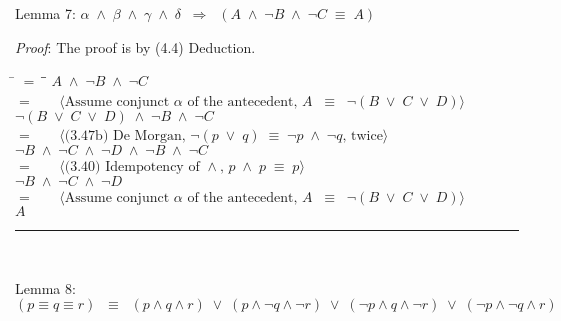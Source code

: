 \documentclass[12pt, fleqn, leqno]{article}
\newcommand{\lgap}{2pt}                             %
\newcommand{\mymathindent}{24pt}                    %
\newcommand{\equivs}{\ensuremath{\;\equiv\;}}       %
\newcommand{\equivss}{\ensuremath{\;\;\equiv\;\;}}  %
\newcommand{\lors}{\ensuremath{\;\lor\;}}           %
\newcommand{\lands}{\ensuremath{\;\land\;}}      %
\newcommand{\impl}{\ensuremath{\Rightarrow}}        %
\newcommand{\myqed}{\rule[-.23ex]{1.2ex}{2.0ex}}
\newcommand{\myqedtab}{\hspace{384pt}}              %
\newcommand{\Gll} {\langle}                         %
\newcommand{\Ggg} {\rangle}                         %
\newcommand{\Hint}[1]     {\ \ \ $\Gll              \mbox{#1} \Ggg$ }   %
\begin{document}
Lemma 7: $\alpha \lands \beta \lands \gamma \lands \delta \;\;\impl\;\; (A \lands \lnot B \lands \lnot C \equivs A)$

\textit{Proof}: The proof is by (4.4) Deduction.
\begin{tabbing}
\hspace{\mymathindent} \= $= \;$ \= \myqedtab \= \kill
	\> \>  $A \lands  \lnot B \lands \lnot C$\\
	\> $=$  \>  \Hint{Assume conjunct $\alpha$ of the antecedent, $A \equivss \lnot (B \lors C \lors D)$}\\[\lgap]
	\> \>   $\lnot (B \lors C \lors D) \lands \lnot B \lands \lnot C$\\
	\> $=$  \>  \Hint{(3.47b) De Morgan, $\lnot (p \lors q) \equivs \lnot p \lands \lnot q$, twice}\\[\lgap]
	\> \>   $\lnot B \lands \lnot C \lands \lnot D \lands \lnot B \lands \lnot C$\\
	\> $=$  \>  \Hint{(3.40) Idempotency of $\land$, $p \lands p \equivs p$}\\[\lgap]
	\> \>   $\lnot B \lands \lnot C \lands \lnot D$\\
	\> $=$  \>  \Hint{Assume conjunct $\alpha$ of the antecedent, $A \equivss \lnot (B \lors C \lors D)$}\\[\lgap]
	\> \>   $A$ \quad \myqed\\
\end{tabbing}

Lemma 8: $(p \equiv q \equiv r) \equivss (p \land q \land r) \lors (p \land \lnot q \land \lnot r) \lors (\lnot p \land q \land \lnot r) \lors (\lnot p \land \lnot q \land r)$
\end{document}
